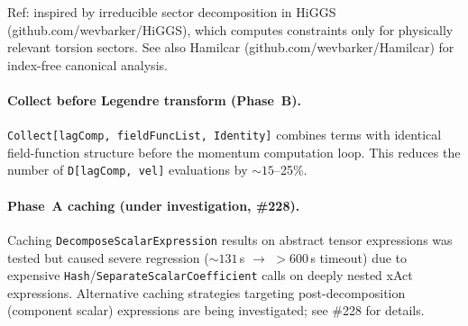 Ref: inspired by irreducible sector decomposition in HiGGS~\cite{Barker:2022kdk} (github.com/wevbarker/HiGGS), which computes constraints only for physically relevant torsion sectors. See also Hamilcar (github.com/wevbarker/Hamilcar) for index-free canonical analysis.

\paragraph{Collect before Legendre transform (Phase~B).}
\texttt{Collect[lagComp, fieldFuncList, Identity]} combines terms with identical field-function structure before the momentum computation loop. This reduces the number of \texttt{D[lagComp, vel]} evaluations by ${\sim}15$--25\%.

\paragraph{Phase~A caching (under investigation, \#228).}
Caching \texttt{DecomposeScalarExpression} results on abstract tensor expressions was tested but caused severe regression (${\sim}131$\,s $\to$ $>600$\,s timeout) due to expensive \texttt{Hash}/\texttt{SeparateScalarCoefficient} calls on deeply nested xAct expressions. Alternative caching strategies targeting post-decomposition (component scalar) expressions are being investigated; see \#228 for details.
